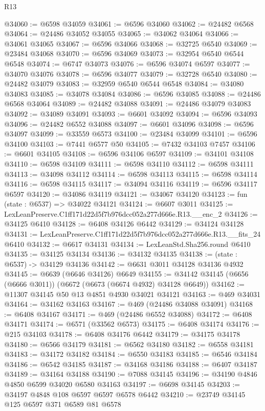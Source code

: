 \begin{lexlean}{R13}
\begin{coremodule}
@34060 := @6598 @34059
@34061 := @6596 @34060
@34062 := @24482 @6568
@34064 := @24486 @34052 @34055
@34065 := @34062 @34064
@34066 := @34061 @34065
@34067 := @6596 @34066
@34068 := @32725 @6540
@34069 := @23484 @34068
@34070 := @6596 @34069
@34073 := @32954 @6540 @6544 @6548
@34074 := @6747 @34073
@34076 := @6596 @34074 @6597
@34077 := @34070 @34076
@34078 := @6596 @34077
@34079 := @32728 @6540
@34080 := @24482 @34079
@34083 := @32959 @6540 @6544 @6548
@34084 := @34080 @34083
@34085 := @34078 @34084
@34086 := @6596 @34085
@34088 := @24486 @6568 @34064
@34089 := @24482 @34088
@34091 := @24486 @34079 @34083
@34092 := @34089 @34091
@34093 := @6601 @34092
@34094 := @6596 @34093
@34096 := @24482 @6552 @34088
@34097 := @6601 @34096
@34098 := @6596 @34097
@34099 := @33559 @6573
@34100 := @23484 @34099
@34101 := @6596 @34100
@34103 := @7441 @6577 @50
@34105 := @7432 @34103 @7457
@34106 := @6601 @34105
@34108 := @6596 @34106 @6597
@34109 := @34101 @34108
@34110 := @6598 @34109
@34111 := @6598 @34110
@34112 := @6598 @34111
@34113 := @34098 @34112
@34114 := @6598 @34113
@34115 := @6598 @34114
@34116 := @6598 @34115
@34117 := @34094 @34116
@34119 := @6596 @34117 @6597
@34120 := @34086 @34119
@34121 := @34067 @34120
@34123 := fun (state : @6537) => @34022 @34121
@34124 := @6607 @3011
@34125 := LexLeanPreserve.C1ff171d22d5f7b976dcc052a277d666e.R13.__enc_2
@34126 := @34125 @6410
@34128 := @6408 @34126 @6442
@34129 := @34124 @34128
@34131 := LexLeanPreserve.C1ff171d22d5f7b976dcc052a277d666e.R13.__fits_24 @6410
@34132 := @6617 @34131
@34134 := LexLeanStd.Sha256.round @6410
@34135 := @34125 @34134
@34136 := @34132 @34135
@34138 := (state : @6537) -> @34129 @34136
@34142 := @6631 @3011 @34128 @34136 @4932
@34145 := @6639 (@6646 @34126) @6649
@34155 := @34142 @34145 (@6656 (@6666 @3011)) (@6672 (@6673 (@6674 @4932) @34128 @6649))
@34162 := @11307 @34145 @50 @13 @4851 @4930 @34021 @34121
@34163 := @469 @34031
@34164 := @34162 @34163
@34167 := @469 (@24486 @34088 @34091)
@34168 := @6408 @34167
@34171 := @469 (@24486 @6552 @34088)
@34172 := @6408 @34171
@34174 := @6571 (@33562 @6573)
@34175 := @6408 @34174
@34176 := @215 @34103
@34178 := @6408 @34176 @6442
@34179 := @34175 @34178
@34180 := @6566 @34179
@34181 := @6562 @34180
@34182 := @6558 @34181
@34183 := @34172 @34182
@34184 := @6550 @34183
@34185 := @6546 @34184
@34186 := @6542 @34185
@34187 := @34168 @34186
@34188 := @6407 @34187
@34189 := @34164 @34188
@34190 := @7088 @34145
@34196 := @34190 @4846 @4850 @6599 @34020 @6580 @34163
@34197 := @6698 @34145
@34203 := @34197 @4848 @108 @6597 @6597 @6578 @6442
@34210 := @23749 @34145 @125 @6597 @371 @6589 @81 @6578

\end{coremodule}
\end{lexlean}
